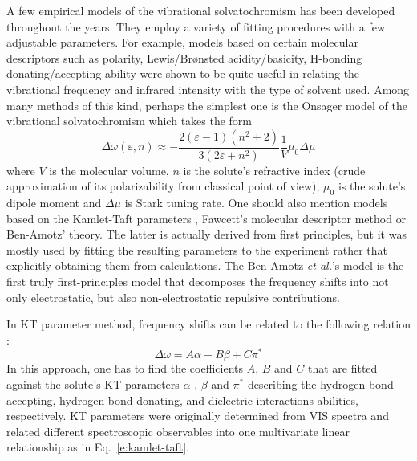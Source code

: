 \documentclass[a4paper,titlepage,twoside,fleqn,12pt]{book}
\begin{document}
\begin{refsection}
A few empirical models of the vibrational solvatochromism has been developed throughout the years.
They employ a variety of fitting procedures with a few adjustable parameters. For example, 
models based on certain molecular descriptors such as polarity, Lewis\slash{}Br{\o}nsted acidity\slash{}basicity, 
H-bonding donating\slash{}accepting ability were shown to be quite useful in relating the vibrational
frequency and infrared intensity with the type of solvent used. Among many methods of this kind,
perhaps the simplest one 
is the Onsager model of the vibrational solvatochromism which
takes the form
%
\begin{equation} \label{e:vibr-onsager}
\Delta \omega(\varepsilon,n) \approx - \frac{2(\varepsilon-1)(n^2+2)}{3(2\varepsilon+n^2)} \frac{1}{V}
 \mu_0\Delta\mu
\end{equation}
%
where $V$ is the molecular volume, $n$ is the solute's refractive index
(crude approximation of its polarizability from classical point of view),
$\mu_0$ is the solute's dipole moment and $\Delta\mu$ is 
Stark tuning rate. \citep{Levinson.Fried.Boxer.JPCB.2012}
One should also mention models based on the
Kamlet\hyp{}Taft parameters \citep{Kamlet.Taft.JACS.1976,Taft.Kamlet.JACS.1976,Kamlet.Abboud.Taft.JACS.1977}, 
Fawcett's molecular descriptor method \citep{Reimers.Hall.JACS.1999,
Fawcett.Liu.Kessler.JPC.1993,Fawcett.Kloss.JCP.1996} or Ben-Amotz' theory. \citep{Ben-Amotz.Lee.Cho.List.JCP.1992} 
The latter is actually derived from first principles, but it was mostly used by fitting
the resulting parameters to the experiment rather that explicitly obtaining them from calculations.
The Ben-Amotz \emph{et al.}'s model is the first
truly first\hyp{}principles model that decomposes the frequency shifts into not only electrostatic, 
but also non\hyp{}electrostatic repulsive contributions.

In KT parameter method, frequency shifts can be related to the following
relation \citep{Zhang.Markiewicz.Doerksen.Smith.Gai.PCCP.2015}:
%
\begin{equation} \label{e:kamlet-taft}
\Delta \omega = A\alpha + B\beta + C\pi^{*}
\end{equation}
%
In this approach, one has to
find the coefficients $A$, $B$ and $C$ that are fitted against
the solute's KT parameters $\alpha$ \citep{Taft.Kamlet.JACS.1976}, 
$\beta$ \citep{Kamlet.Taft.JACS.1976} and $\pi^{*}$ \citep{Kamlet.Abboud.Taft.JACS.1977} 
describing the hydrogen bond accepting,
hydrogen bond donating, and dielectric interactions abilities, respectively.
KT parameters were originally determined from VIS spectra and related different
spectroscopic observables into one multivariate linear relationship as in Eq.~\eqref{e:kamlet-taft}.


\end{refsection}
\end{document}
